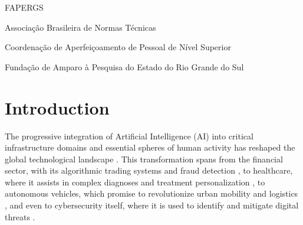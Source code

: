 \documentclass[twoside,brazilian,english]{UNISINOSmonografia}
\begin{document}
%
\begin{listadesiglas}{FAPERGS}
\item[ABNT] Associação Brasileira de Normas Técnicas
\item[CAPES] Coordenação de Aperfeiçoamento de Pessoal de Nível Superior
\item[FAPERGS] Fundação de Amparo à Pesquisa do Estado do Rio Grande do Sul
\end{listadesiglas}

%

\tableofcontents

\chapter{Introduction}

The progressive integration of Artificial Intelligence (AI) into critical infrastructure domains and essential spheres of human activity has reshaped the global technological landscape \cite{Russell2022}. This transformation spans from the financial sector, with its algorithmic trading systems and fraud detection \cite{Henrique2019}, to healthcare, where it assists in complex diagnoses and treatment personalization \cite{Rajpurkar2017, Chen2020}, to autonomous vehicles, which promise to revolutionize urban mobility and logistics \cite{Grigorescu2020}, and even to cybersecurity itself, where it is used to identify and mitigate digital threats \cite{Russell2022}.
\end{document}
